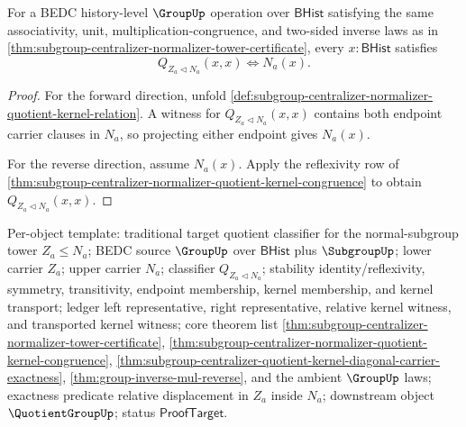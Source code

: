 \begin{theorem}
\label{thm:subgroup-centralizer-quotient-kernel-diagonal-carrier-exactness}
For a BEDC history-level $\GroupUp$ operation over $\mathsf{BHist}$ satisfying
the same associativity, unit, multiplication-congruence, and two-sided inverse
laws as in
\autoref{thm:subgroup-centralizer-normalizer-tower-certificate}, every
$x:\mathsf{BHist}$ satisfies
$$
Q_{Z_a\triangleleft N_a}(x,x)\Longleftrightarrow N_a(x).
$$
\end{theorem}
\begin{proof}
For the forward direction, unfold
\autoref{def:subgroup-centralizer-normalizer-quotient-kernel-relation}. A
witness for $Q_{Z_a\triangleleft N_a}(x,x)$ contains both endpoint carrier
clauses in $N_a$, so projecting either endpoint gives $N_a(x)$.

For the reverse direction, assume $N_a(x)$. Apply the reflexivity row of
\autoref{thm:subgroup-centralizer-normalizer-quotient-kernel-congruence} to
obtain $Q_{Z_a\triangleleft N_a}(x,x)$.
\end{proof}

Per-object template: traditional target quotient classifier for the
normal-subgroup tower $Z_a\leq N_a$; BEDC source $\GroupUp$ over
$\mathsf{BHist}$ plus $\SubgroupUp$; lower carrier $Z_a$; upper carrier
$N_a$; classifier $Q_{Z_a\triangleleft N_a}$; stability identity/reflexivity,
symmetry, transitivity, endpoint membership, kernel membership, and kernel transport;
ledger left representative, right representative, relative kernel witness, and
transported kernel witness; core theorem list
\autoref{thm:subgroup-centralizer-normalizer-tower-certificate},
\autoref{thm:subgroup-centralizer-normalizer-quotient-kernel-congruence},
\autoref{thm:subgroup-centralizer-quotient-kernel-diagonal-carrier-exactness},
\autoref{thm:group-inverse-mul-reverse}, and the ambient $\GroupUp$ laws;
exactness predicate relative displacement in $Z_a$ inside $N_a$; downstream
object $\QuotientGroupUp$; status $\mathsf{ProofTarget}$.


